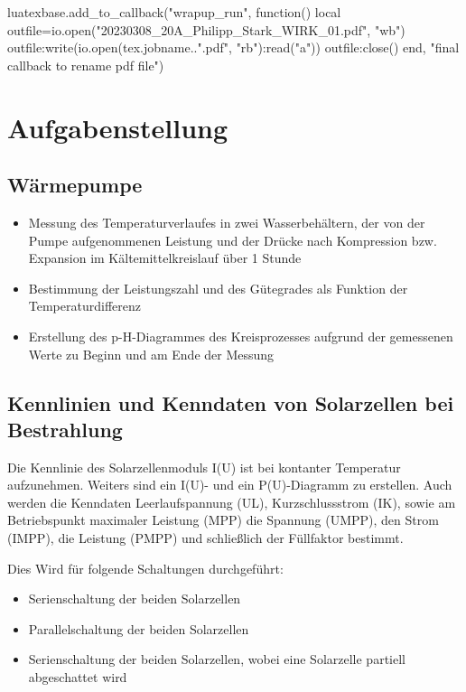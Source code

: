 \documentclass[12pt,english,ngerman]{scrartcl}
\begin{document}
\begin{luacode*}
	luatexbase.add_to_callback("wrapup_run", function()
	local outfile=io.open("20230308_20A_Philipp_Stark_WIRK_01.pdf", "wb")
	outfile:write(io.open(tex.jobname..".pdf", "rb"):read("a"))
	outfile:close()
	end, "final callback to rename pdf file")
\end{luacode*}

% 
\tableofcontents

\newpage

\section{Aufgabenstellung\label{Auf}}

\subsection{Wärmepumpe}

\begin{itemize}
	\item Messung des Temperaturverlaufes in zwei Wasserbehältern, der von der Pumpe
	      aufgenommenen Leistung und der Drücke nach Kompression bzw. Expansion im
	      Kältemittelkreislauf über 1 Stunde
	\item Bestimmung der Leistungszahl und des Gütegrades als Funktion der
	      Temperaturdifferenz
	\item Erstellung des p-H-Diagrammes des Kreisprozesses aufgrund der gemessenen Werte
	      zu Beginn und am Ende der Messung
\end{itemize}
\subsection{Kennlinien und Kenndaten von Solarzellen bei Bestrahlung}

Die Kennlinie des Solarzellenmoduls I(U) ist bei kontanter Temperatur
aufzunehmen. Weiters sind ein I(U)- und ein P(U)-Diagramm zu erstellen. Auch
werden die Kenndaten Leerlaufspannung (UL), Kurzschlussstrom (IK), sowie am
Betriebspunkt maximaler Leistung (MPP) die Spannung (UMPP), den Strom (IMPP),
die Leistung (PMPP) und schließlich der Füllfaktor bestimmt.

Dies Wird für folgende Schaltungen durchgeführt:

\begin{itemize}
	\item Serienschaltung der beiden Solarzellen
	\item Parallelschaltung der beiden Solarzellen
	\item Serienschaltung der beiden Solarzellen, wobei eine Solarzelle partiell
	      abgeschattet wird
\end{itemize}
\end{document}
